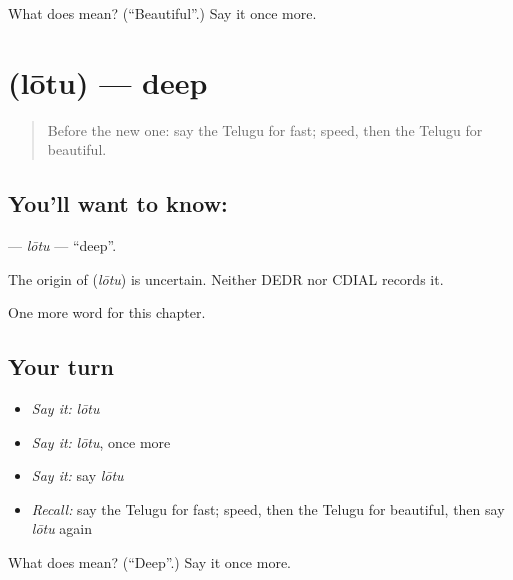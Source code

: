 \begin{tcolorbox}[breakable,colback=teal!4,colframe=teal!35!black,title={Before you move on}]
What does  mean? (\textquotedblleft{}Beautiful\textquotedblright{}.) Say it once more.
\end{tcolorbox}
\section[\texorpdfstring{\te{లోతు} (lōtu)}{లోతు (lōtu)}]{ (lōtu) — deep}

\label{lesson:TE-C138-lotu}



\begin{quote}
Before the new one: say the Telugu for fast; speed, then the Telugu for beautiful.
\end{quote}

\subsection*{You'll want to know: }
\textbf{} — \emph{lōtu} — \textquotedblleft{}deep\textquotedblright{}.

\begin{cousinweb}
The origin of \textbf{} (\emph{lōtu}) is uncertain. Neither DEDR nor CDIAL records it.
\end{cousinweb}

\begin{grammarlens}[title={What you've built}]
One more word for this chapter.
\end{grammarlens}

\subsection*{Your turn}
\begin{itemize}
\raggedright
  \item \emph{Say it:} \emph{lōtu}
  \item \emph{Say it:} \emph{lōtu}, once more
  \item \emph{Say it:} say \emph{lōtu}
  \item \emph{Recall:} say the Telugu for fast; speed, then the Telugu for beautiful, then say \emph{lōtu} again
\end{itemize}

\begin{tcolorbox}[breakable,colback=teal!4,colframe=teal!35!black,title={Before you move on}]
What does  mean? (\textquotedblleft{}Deep\textquotedblright{}.) Say it once more.
\end{tcolorbox}
